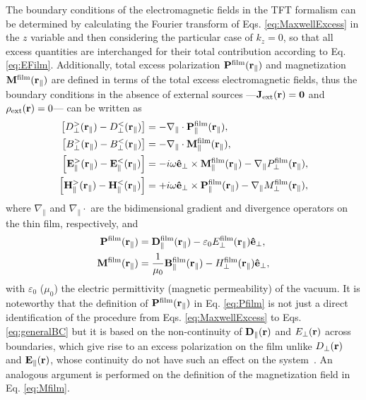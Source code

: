 The boundary conditions of the electromagnetic fields in the TFT formalism can be determined by calculating the Fourier transform  of Eqs. \eqref{eq:MaxwellExcess}  in the $z$ variable and then considering the particular case of $k_z = 0$, so that all excess quantities are interchanged for their total contribution according to Eq. \eqref{eq:EFilm}. Additionally,  total excess polarization $\vb{P}^\text{film}(\vb{r}_\parallel)$ and magnetization $\vb{M}^\text{film}(\vb{r}_\parallel)$ are defined in terms of the total excess electromagnetic fields, thus the boundary conditions in the absence of external sources ---$\vb{J}_\text{ext}(\vb{r})=\vb{0}$ and $\rho_\text{ext}(\vb{r})=0$--- can be written as~\cite{bedeaux_optical_2004,lazzari_granfilm_2002}
%
\begin{subequations}%
\begin{align}
		\qty[D_\perp^>(\vb{r}_\parallel)-D_\perp^<(\vb{r}_\parallel)]  & = -\nabla_\parallel\cdot\vb{P}_\parallel^\text{film}(\vb{r}_\parallel),\\
		\qty[B_\perp^>(\vb{r}_\parallel)-B_\perp^<(\vb{r}_\parallel)]  & = -\nabla_\parallel\cdot\vb{M}_\parallel^\text{film}(\vb{r}_\parallel),\\
		\qty[\vb{E}^>_\parallel(\vb{r}_\parallel)-\vb{E}^<_\parallel(\vb{r}_\parallel)] & = -i{\omega}\vu{e}_\perp\times \vb{M}^\text{film}_\parallel(\vb{r}_\parallel)-\nabla_\parallel P_\perp^\text{film}(\vb{r}_\parallel),\\
		\qty[\vb{H}^>_\parallel(\vb{r}_\parallel)-\vb{H}^<_\parallel(\vb{r}_\parallel)] & = +i{\omega}\vu{e}_\perp\times \vb{P}^\text{film}_\parallel(\vb{r}_\parallel)-\nabla_\parallel M_\perp^\text{film}(\vb{r}_\parallel),
\end{align}\label{eq:generalBC}%
\end{subequations}
%
where $\nabla_\parallel$ and $\nabla_\parallel\cdot$ are the bidimensional gradient and divergence operators on the thin film, respectively, and~\cite{bedeaux_optical_2004}
%
\begin{align}
	\vb{P}^\text{film}(\vb{r}_\parallel) &= \vb{D}_\parallel^\text{film}(\vb{r}_\parallel) - \varepsilon_0 {E}_\perp^\text{film}(\vb{r}_\parallel) \vu{e}_\perp,
	\label{eq:Pfilm}\\
%	
	\vb{M}^\text{film}(\vb{r}_\parallel) &= \frac{1}{\mu_0}\vb{B}_\parallel^\text{film}(\vb{r}_\parallel) -  {H}_\perp^\text{film}(\vb{r}_\parallel) \vu{e}_\perp,
	\label{eq:Mfilm}
\end{align}
%
with $\varepsilon_0$ ($\mu_0$) the electric permittivity (magnetic permeability) of the vacuum. It is noteworthy that the definition of $\vb{P}^\text{film}(\vb{r}_\parallel)$ in Eq. \eqref{eq:Pfilm} is not just a direct identification of the procedure from Eqs. \eqref{eq:MaxwellExcess} to Eqs. \eqref{eq:generalBC} but it is based on the non-continuity of $ \vb{D}_\parallel(\vb{r})$ and $E_\perp(\vb{r})$ across boundaries, which give rise to an excess polarization on the film unlike $D_\perp(\vb{r})$ and $\vb{E}_\parallel(\vb{r})$, whose continuity do not have such an effect on the system~\cite{bedeaux_optical_2004,lazzari_granfilm_2002}. An analogous argument is performed on the definition of the magnetization field in Eq. \eqref{eq:Mfilm}.

